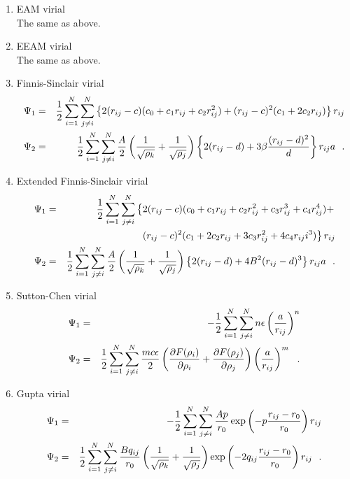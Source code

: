 \begin{enumerate}
\item EAM virial \\
The same as above.
\item EEAM virial \\
The same as above.
\item Finnis-Sinclair virial
\begin{eqnarray}
\Psi_{1} &=& {1 \over 2} \sum_{i=1}^{N} \sum_{j \ne i}^{N}
\left\{ 2 (r_{ij}-c) (c_{0}+c_{1}r_{ij}+c_{2}r_{ij}^{2}) +
(r_{ij}-c)^{2} (c_{1}+2c_{2}r_{ij}) \right\} r_{ij} \nonumber \\
\Psi_{2} &=& {1 \over 2} \sum_{i=1}^{N} \sum_{j \ne i}^{N}
{A \over 2} \left( {1 \over \sqrt{\rho_{k}}} + {1 \over \sqrt{\rho_{j}}} \right)
\left\{ 2(r_{ij}-d) + 3 \beta \frac{(r_{ij}-d)^{2}}{d} \right\} r_{ij}a~~.
\end{eqnarray}
\item Extended Finnis-Sinclair virial
\begin{eqnarray}
\Psi_{1} &=& {1 \over 2} \sum_{i=1}^{N} \sum_{j \ne i}^{N}
\left\{ 2 (r_{ij}-c) (c_{0}+c_{1}r_{ij}+c_{2}r_{ij}^{2}+c_{3}r_{ij}^{3}+c_{4}r_{ij}^{4}) + \right. \nonumber \\
& & \phantom{xxxxxxxx} \left. (r_{ij}-c)^{2} (c_{1}+2c_{2}r_{ij}+3c_{3}r_{ij}^{2}+4c_{4}r_{ij}i^{3}) \right\} r_{ij} \\
\Psi_{2} &=& {1 \over 2} \sum_{i=1}^{N} \sum_{j \ne i}^{N}
{A \over 2} \left( {1 \over \sqrt{\rho_{k}}} + {1 \over \sqrt{\rho_{j}}} \right)
\left\{ 2(r_{ij}-d) + 4 B^{2} (r_{ij}-d)^{3} \right\} r_{ij}a~~. \nonumber
\end{eqnarray}
\item Sutton-Chen virial
\begin{eqnarray}
\Psi_{1} &=& -{1 \over 2} \sum_{i=1}^{N} \sum_{j \ne i}^{N} n \epsilon \left( \frac{a}{r_{ij}} \right)^{n} \nonumber \\
\Psi_{2} &=& {1 \over 2} \sum_{i=1}^{N} \sum_{j \ne i}^{N} \frac{m c \epsilon}{2} \left( \frac{\partial F(\rho_{i})}{\partial \rho_{i}} +
\frac{\partial F(\rho_{j})}{\partial \rho_{j}} \right) \left( \frac{a}{r_{ij}} \right)^{m}~~.
\end{eqnarray}
\item Gupta virial
\begin{eqnarray}
\Psi_{1} &=& -{1 \over 2} \sum_{i=1}^{N} \sum_{j \ne i}^{N}
\frac{A p}{r_{0}} \exp \left( -p \frac{r_{ij}-r_{0}}{r_{0}} \right) r_{ij} \nonumber \\
\Psi_{2} &=& {1 \over 2} \sum_{i=1}^{N} \sum_{j \ne i}^{N} \frac{B q_{ij}}{r_{0}}
\left( {1 \over \sqrt{\rho_{k}}} + {1 \over \sqrt{\rho_{j}}} \right)
\exp \left( -2 q_{ij} \frac{r_{ij}-r_{0}}{r_{0}} \right) r_{ij}~~.
\end{eqnarray}
\end{enumerate}


